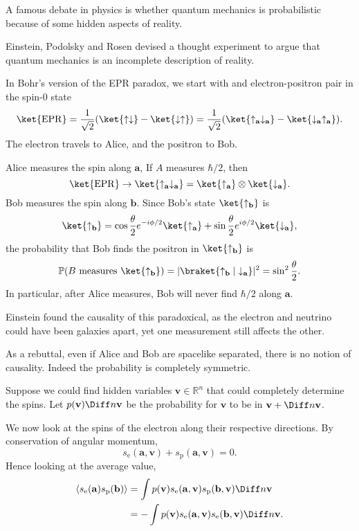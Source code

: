 \documentclass[12pt]{article}
\begin{document}
A famous debate in physics is whether quantum mechanics is probabilistic because of some hidden aspects of reality.

Einstein, Podolsky and Rosen devised a thought experiment to argue that quantum mechanics is an incomplete description of reality.

In Bohr's version of the EPR paradox, we start with and electron-positron pair in the spin-0 state
 \[
	 \ket{\mathrm{EPR}} = \frac{1}{\sqrt 2} ( \ket{\uparrow \downarrow} - \ket{\downarrow \uparrow}) = \frac{1}{\sqrt 2}(\ket{\uparrow_{\mathbf{a}}\downarrow_{\mathbf{a}}} - \ket{\downarrow_{\mathbf{a}}\uparrow_{\mathbf{a}}}).
\]
The electron travels to Alice, and the positron to Bob.

Alice measures the spin along $\mathbf{a}$, If $A$ measures $\hbar/2$, then
\[
	\ket{\mathrm{EPR}} \to \ket{\uparrow_{\mathbf{a}} \downarrow_{\mathbf{a}}} = \ket{\uparrow_{\mathbf{a}}} \otimes \ket{\downarrow_{\mathbf{a}}}.
\]
Bob measures the spin along $\mathbf{b}$. Since Bob's state $\ket{\uparrow_{\mathbf{b}}}$ is
\[
	\ket{\uparrow_{\mathbf{b}}} = \cos \frac{\theta}{2} e^{-i \phi / 2} \ket{\uparrow_{\mathbf{a}}} + \sin \frac{\theta}{2} e^{i \phi/2} \ket{\downarrow_{\mathbf{a}}},
\]
the probability that Bob finds the positron in $\ket{\uparrow_{\mathbf{b}}}$ is
\[
	\mathbb{P}(B \text{ measures } \ket{\uparrow_{\mathbf{b}}}) = |\braket{\uparrow_{\mathbf{b}}|\downarrow_{\mathbf{a}}}|^2 = \sin^2 \frac{\theta}{2}.
\]
In particular, after Alice measures, Bob will never find $\hbar/2$ along $\mathbf{a}$.

Einstein found the causality of this paradoxical, as the electron and neutrino could have been galaxies apart, yet one measurement still affects the other.

As a rebuttal, even if Alice and Bob are spacelike separated, there is no notion of causality. Indeed the probability is completely symmetric.

Suppose we could find hidden variables $\mathbf{v} \in \mathbb{R}^{n}$ that could completely determine the spins. Let $p(\mathbf{v}) \Diff n \mathbf{v}$ be the probability for $\mathbf{v}$ to be in $\mathbf{v} + \Diff n \mathbf{v}$.

We now look at the spins of the electron along their respective directions. By conservation of angular momentum,
\[
s_{\mathrm{e}}(\mathbf{a}, \mathbf{v}) + s_{\mathrm{p}}(\mathbf{a}, \mathbf{v}) = 0.
\]
Hence looking at the average value,
\begin{align*}
	\langle s_{\mathrm{e}}(\mathbf{a}) s_{\mathrm{p}}(\mathbf{b})\rangle &= \int p(\mathbf{v}) s_{\mathrm{e}}(\mathbf{a}, \mathbf{v}) s_{\mathrm{p}}(\mathbf{b}, \mathbf{v}) \Diff n \mathbf{v} \\
									     &= - \int p(\mathbf{v}) s_{\mathrm{e}}(\mathbf{a}, \mathbf{v}) s_{\mathrm{e}}(\mathbf{b}, \mathbf{v}) \Diff n \mathbf{v}.
\end{align*}
\end{document}
